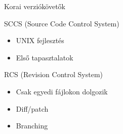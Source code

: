 
\begin{frame}{Korai verziókövetők}
    \pause
    \begin{block}{SCCS (Source Code Control System)}
        \begin{itemize}
            \pause \item UNIX fejlesztés
            \pause \item Első tapasztalatok
        \end{itemize}
    \end{block}
    \pause
    \begin{block}{RCS (Revision Control System)}
        \begin{itemize}
            \pause \item Csak egyedi fájlokon dolgozik
            \pause \item Diff/patch
            \pause \item Branching
        \end{itemize}
    \end{block}
\end{frame}


